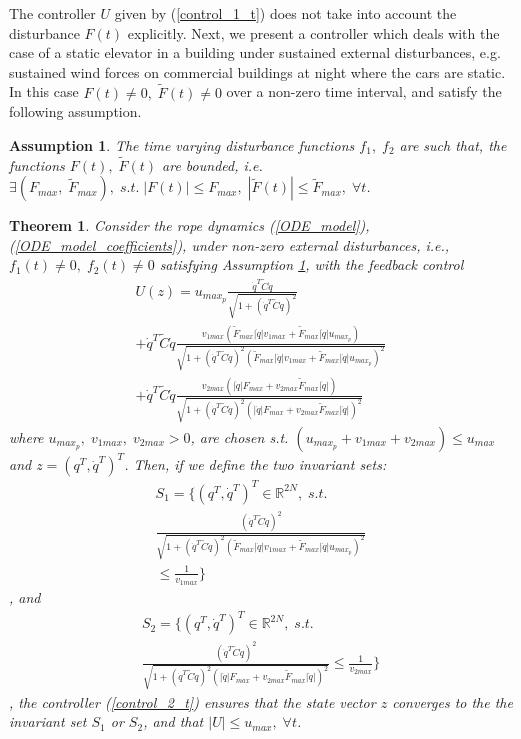 \documentclass[letterpaper, 11 pt, conference]{ieeeconf}
\newtheorem{thm}{\bf Theorem}
\newtheorem{assumption}{Assumption}
\begin{document}
The controller $U$ given by (\ref{control_1_t}) does not take into
account the disturbance $F(t)$ explicitly. Next, we present a
controller which deals with the case of a static elevator in a
building under sustained external disturbances, e.g. sustained
wind forces on commercial buildings at night where the cars are
static. In this case $F(t)\neq 0,\;\tilde{F}(t)\neq 0$ over a
non-zero time interval, and satisfy the following
assumption.\\
\begin{assumption}\label{assumption0}
The time varying disturbance functions $f_{1},\;f_{2}$ are such
that, the functions $F(t),\;\tilde{F}(t)$ are bounded, i.e.
$\exists (F_{max},\;\tilde{F}_{max}),\;s.t.\;|F(t)|\leq
F_{max},\;|\tilde{F}(t)|\leq \tilde{F}_{max},\;\forall t$.
\end{assumption}
\begin{thm}\label{theorem3}
Consider the rope dynamics (\ref{ODE_model}),
(\ref{ODE_model_coefficients}), under non-zero external
disturbances, i.e., $f_{1}(t)\neq 0,\;f_{2}(t)\neq 0$ satisfying
Assumption \ref{assumption0}, with the feedback control
\begin{equation}\label{control_2_t}
\begin{array}{l}
{\scriptstyle U(z)=u_{max_p}\frac{\dot{q}^{T}\tilde{C}\dot{q}
}{\sqrt{1+(\dot{q}^{T}\tilde{C}\dot{q})^{2}}}}\\{\scriptstyle
+\dot{q}^{T}\tilde{C}\dot{q}}{\scriptstyle\frac{v_{1max}(\tilde{F}_{max}|\dot{q}|v_{1max}+\tilde{F}_{max}|\dot{q}|u_{max_p})}{\sqrt{1+(\dot{q}^{T}\tilde{C}\dot{q})^{2}(\tilde{F}_{max}|\dot{q}|v_{1max}+\tilde{F}_{max}|\dot{q}|u_{max_p})^{2}}}}\\
{\scriptstyle+\dot{q}^{T}\tilde{C}\dot{q}\frac{v_{2max}(|\dot{q}|F_{max}+v_{2max}\tilde{F}_{max}|\dot{q}|)}{\sqrt{1+(\dot{q}^{T}\tilde{C}\dot{q})^{2}(|\dot{q}|F_{max}+v_{2max}\tilde{F}_{max}|\dot{q}|)^{2}}}}
\end{array}
\end{equation}
where $u_{max_p},\;v_{1max},\;v_{2max}>0$, are chosen s.t.
$(u_{max_p}+v_{1max}+v_{2max})\leq u_{max}$ and
$z=(q^{T},\dot{q}^{T})^{T}$. Then, if we define the two invariant
sets: $$\begin{array}{l}
S_{1}=\{(q^{T},\dot{q}^{T})^{T}\in\mathbb{R}^{2N},\;s.t.\;\\\frac{(\dot{q}^{T}\tilde{C}\dot{q})^{2}}{\sqrt{1+(\dot{q}^{T}\tilde{C}\dot{q})^{2}(\tilde{F}_{max}|\dot{q}|v_{1max}+\tilde{F}_{max}|\dot{q}|u_{max_p})^{2}}}\\\leq\frac{1}{v_{1max}}\}\end{array}$$,
and
$$\begin{array}{l}S_{2}=\{(q^{T},\dot{q}^{T})^{T}\in\mathbb{R}^{2N},\;s.t.\;\\\frac{(\dot{q}^{T}\tilde{C}\dot{q})^{2}}{\sqrt{1+(\dot{q}^{T}\tilde{C}\dot{q})^{2}(|\dot{q}|F_{max}+v_{2max}\tilde{F}_{max}|\dot{q}|)^{2}}}\leq\frac{1}{v_{2max}}\}\end{array}$$,
the controller (\ref{control_2_t}) ensures that the state vector
$z$ converges to the the invariant set $S_{1}$ or $S_{2}$, and
that $|U|\leq u_{max},\;\forall t$.
\end{thm}
\end{document}
